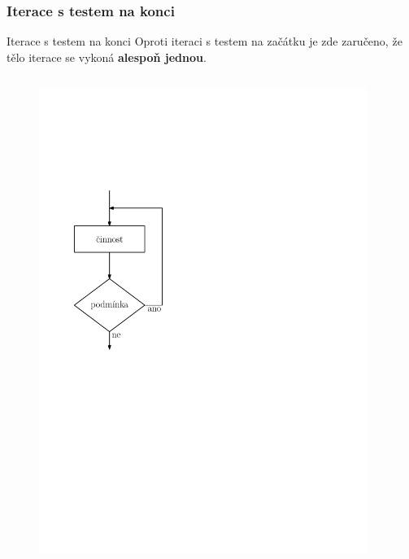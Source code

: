 \documentclass[11pt,aspectratio=169]{beamer}
\begin{document}
    \subsubsection{Iterace s testem na konci}
    \begin{frame}{Iterace s testem na konci}
        Oproti iteraci s testem na začátku je zde zaručeno, že tělo iterace se vykoná \textbf{alespoň jednou}.
        \begin{columns}
            \begin{column}{.5\textwidth}
                \begin{figure}
                    \centering
                    \includegraphics[scale=.5]{../images/00-vyvojak-iterace-konec.pdf}
                \end{figure}
            \end{column}
            \begin{column}{.5\textwidth}

\end{column}
\end{columns}
\end{frame}
\end{document}
